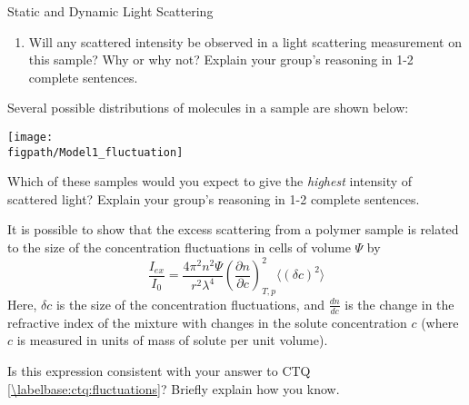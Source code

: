 \begin{activity}{Static and Dynamic Light Scattering}
\begin{ctqs}
\begin{enumerate}
			\item Will any scattered intensity be observed in a light scattering measurement on this sample?  Why or why not?  Explain your group's reasoning in 1-2 complete sentences.
	
		\begin{solution}[1in]
		\end{solution}
			
		\end{enumerate}
		
	\question Several possible distributions of molecules in a sample are shown below: \label{\labelbase:ctq:fluctuations}
	
	\centerline{\texttt{[image: \\figpath/Model1\_fluctuation]}}
	
		Which of these samples would you expect to give the \emph{highest} intensity of scattered light?  Explain your group's reasoning in 1-2 complete sentences.
	
		\begin{solution}[1in]
		\end{solution}

\end{ctqs}

\begin{infobox}
	It is possible to show that the excess scattering from a polymer sample is related to the size of the concentration fluctuations in cells of volume $\Psi$ by
	\begin{equation*}
		\frac{I_{ex}}{I_0} = \frac{4 \pi^2 n^2 \Psi}{r^2 \lambda^4}\left(\frac{\partial n}{\partial c}\right)^2_{T,p} \langle ( \delta c )^2 \rangle
	\end{equation*}
	Here, $\delta c$ is the size of the concentration fluctuations, and $\frac{d n}{dc}$ is the change in the refractive index of the mixture with changes in the solute concentration $c$ (where $c$ is measured in units of mass of solute per unit volume).
\end{infobox}

\begin{ctqs}

	\question Is this expression consistent with your answer to CTQ \ref{\labelbase:ctq:fluctuations}?  Briefly explain how you know.
	
		\begin{solution}[1in]
		\end{solution}
	
\end{ctqs}


\end{activity}
